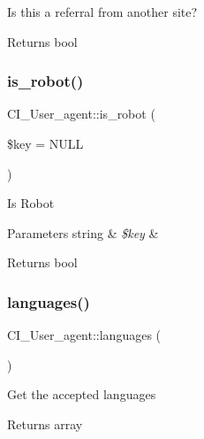 Is this a referral from another site?

\begin{DoxyReturn}{Returns}
bool 
\end{DoxyReturn}
\mbox{\label{class_c_i___user__agent_a0277d914261032a961d2a8e7cb758a4b}} 
\subsubsection{\texorpdfstring{is\+\_\+robot()}{is\_robot()}}
{\footnotesize\ttfamily C\+I\+\_\+\+User\+\_\+agent\+::is\+\_\+robot (\begin{DoxyParamCaption}\item[{}]{\$key = {\ttfamily NULL} }\end{DoxyParamCaption})}

Is Robot


\begin{DoxyParams}[1]{Parameters}
string & {\em \$key} & \\
\hline
\end{DoxyParams}
\begin{DoxyReturn}{Returns}
bool 
\end{DoxyReturn}
\mbox{\label{class_c_i___user__agent_a3c7f05c22ad81e0904f6799a242c0bd0}} 
\subsubsection{\texorpdfstring{languages()}{languages()}}
{\footnotesize\ttfamily C\+I\+\_\+\+User\+\_\+agent\+::languages (\begin{DoxyParamCaption}{ }\end{DoxyParamCaption})}

Get the accepted languages

\begin{DoxyReturn}{Returns}
array 
\end{DoxyReturn}
\mbox{\label{class_c_i___user__agent_ab9bc60c3f41edbe9b150e327028e212c}} 
